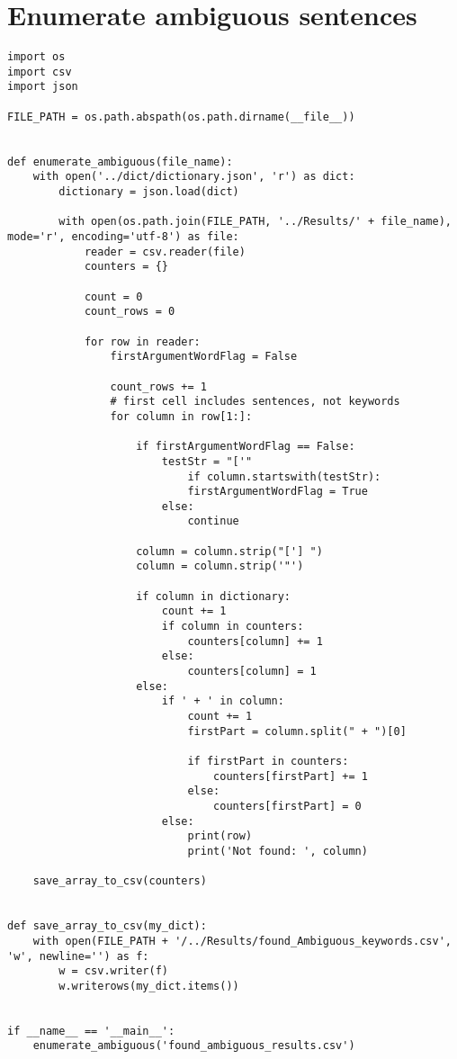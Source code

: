 
\chapter{Enumerate ambiguous sentences}

\label{Appendix5}

\begin{lstlisting}[language=iPython]
import os
import csv
import json

FILE_PATH = os.path.abspath(os.path.dirname(__file__))


def enumerate_ambiguous(file_name):
	with open('../dict/dictionary.json', 'r') as dict:
		dictionary = json.load(dict)
	
		with open(os.path.join(FILE_PATH, '../Results/' + file_name), mode='r', encoding='utf-8') as file:
			reader = csv.reader(file)
			counters = {}
			
			count = 0
			count_rows = 0
			
			for row in reader:
				firstArgumentWordFlag = False
				
				count_rows += 1
				# first cell includes sentences, not keywords
				for column in row[1:]:
				
					if firstArgumentWordFlag == False:
						testStr = "['"
							if column.startswith(testStr):
							firstArgumentWordFlag = True
						else:
							continue
					
					column = column.strip("['] ")
					column = column.strip('"')
					
					if column in dictionary:
						count += 1
						if column in counters:
							counters[column] += 1
						else:
							counters[column] = 1
					else:
						if ' + ' in column:
							count += 1
							firstPart = column.split(" + ")[0]
							
							if firstPart in counters:
								counters[firstPart] += 1
							else:
								counters[firstPart] = 0
						else:
							print(row)
							print('Not found: ', column)

	save_array_to_csv(counters)


def save_array_to_csv(my_dict):
	with open(FILE_PATH + '/../Results/found_Ambiguous_keywords.csv', 'w', newline='') as f:
		w = csv.writer(f)
		w.writerows(my_dict.items())


if __name__ == '__main__':
	enumerate_ambiguous('found_ambiguous_results.csv')

\end{lstlisting}

